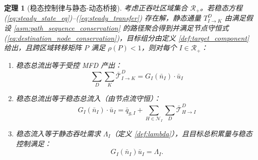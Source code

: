 \documentclass[a4paper,12pt]{article}
\theoremstyle{plain}
\newtheorem{theorem}{定理}[section]
\theoremstyle{definition}
\theoremstyle{remark}
\begin{document}
\begin{theorem}[稳态控制律与静态-动态桥接]\label{thm:steady_state_bridge}
考虑正吞吐区域集合 $\mathcal R_+$。若稳态方程 (\ref{eq:steady_state_eq})--(\ref{eq:steady_transfer}) 存在解，静态通量 $T_{I\to K}^D$ 由满足假设 \ref{asm:path_sequence_conservation} 的路径聚合得到并满足节点守恒式 (\ref{eq:destination_node_conservation})，目标组分由定义 \ref{def:target_component} 给出，且跨区域转移矩阵 $P$ 满足 $\rho(P)<1$，则对每个 $I\in\mathcal R_+$：
\begin{enumerate}
    \item 稳态总流出等于受控 MFD 产出：
    \begin{equation}\label{eq:steady_total_outflow}
        \sum_{D} \sum_{K} \bar{\mathcal{T}}_{I \to K}^D = G_I(\bar{n}_I) \cdot \bar{u}_I
    \end{equation}
    \item 稳态总流出等于稳态总流入（由节点流守恒）：
    \begin{equation}\label{eq:steady_balance}
        G_I(\bar{n}_I) \cdot \bar{u}_I = \bar{q}_{g,I} + \sum_{H \in \mathcal{N}_I} \sum_{D} \bar{\mathcal{T}}_{H \to I}^D
    \end{equation}
    \item 稳态流入等于静态吞吐需求 $\Lambda_I$（定义 \ref{def:lambda}），且目标总积累量与稳态控制满足：
    \begin{equation}\label{eq:matching_corollary}
        G_I(\bar{n}_I)\bar{u}_I = \Lambda_I.
    \end{equation}
\end{enumerate}
\end{theorem}
\end{document}
